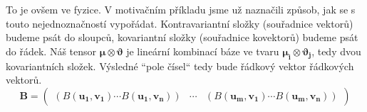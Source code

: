 \documentclass[a5paper,12pt]{amsbook}
\theoremstyle{definition}
\newcommand{\myvec}[1]{\bm{#1}}
\newcommand{\mymatrix}[1]{\mathbf{#1}}
\begin{document}
To je ovšem ve fyzice. V motivačním příkladu jsme už naznačili způsob, jak se s touto nejednoznačností
vypořádat. Kontravariantní složky (souřadnice vektorů) budeme psát do sloupců, kovariantní složky
(souřadnice kovektorů) budeme psát do řádek. Náš tensor
$\myvec{\mu}\otimes\myvec{\vartheta}$ je lineární kombinací báze ve tvaru
$\myvec{\mu_i}\otimes\myvec{\vartheta_j}$, tedy dvou kovariantních složek. Výsledné ``pole čísel``
tedy bude řádkový vektor řádkových vektorů.
\begin{equation*}
\mymatrix{B} = 
\left(\begin{array}{ccc}
  \left(
    B(\myvec{u_1}, \myvec{v_1}) \cdots B(\myvec{u_1}, \myvec{v_n})
  \right) &
  \cdots &
  \left(
    B(\myvec{u_m}, \myvec{v_1}) \cdots B(\myvec{u_m}, \myvec{v_n})
  \right)
\end{array}\right)
\end{equation*}
\end{document}
